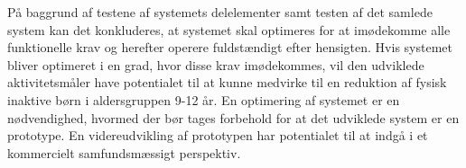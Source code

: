 På baggrund af testene af systemets delelementer samt testen af det samlede system kan det konkluderes, at systemet skal optimeres for at imødekomme alle funktionelle krav og herefter operere fuldstændigt efter hensigten. Hvis systemet bliver optimeret i en grad, hvor disse krav imødekommes, vil den udviklede aktivitetsmåler have potentialet til at kunne medvirke til en reduktion af fysisk inaktive børn i aldersgruppen 9-12 år. En optimering af systemet er en nødvendighed, hvormed der bør tages forbehold for at det udviklede system er en prototype. En videreudvikling af prototypen har potentialet til at indgå i et kommercielt samfundsmæssigt perspektiv.